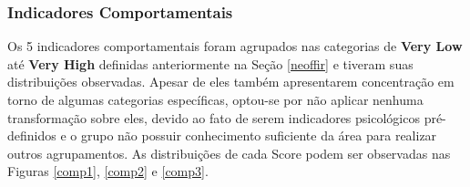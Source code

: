 \documentclass[
	article,			%
	11pt,				%
	oneside,			%
	a4paper,			%
	english,			%
	brazil,				%
	sumario=tradicional
	]{abntex2}
\begin{document}
\subsubsection{Indicadores Comportamentais}

Os 5 indicadores comportamentais foram agrupados nas categorias de \textbf{Very Low} até \textbf{Very High} definidas anteriormente na Seção \ref{neoffir} e tiveram suas distribuições observadas. Apesar de eles também apresentarem concentração em torno de algumas categorias específicas, optou-se por não aplicar nenhuma transformação sobre eles, devido ao fato de serem indicadores psicológicos pré-definidos e o grupo não possuir conhecimento suficiente da área para realizar outros agrupamentos. As distribuições de cada Score podem ser observadas nas Figuras \ref{comp1}, \ref{comp2} e \ref{comp3}.
\end{document}
